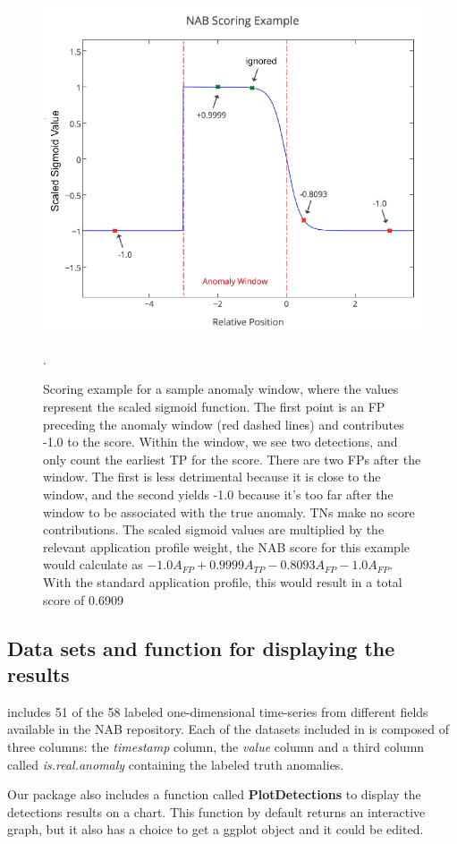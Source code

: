 \documentclass[a4paper]{article}
\begin{document}
\begin{figure}[htbp]
\centering
\includegraphics[width=0.7\linewidth]{ScoreExample.PNG}
\caption{Scoring example for a sample anomaly window, where the values represent the scaled sigmoid function. The first point is an FP preceding the anomaly window (red dashed lines) and contributes -1.0 to the score. Within the window, we see two detections, and only count the earliest TP for the score. There are two FPs after the window. The first is less detrimental because it is close to the window, and the second yields -1.0 because it's too far after the window to be associated with the true anomaly. TNs make no score contributions. The scaled sigmoid values are multiplied by the relevant application profile weight, the NAB score for this example would calculate as \( -1.0 A_{FP} + 0.9999 A_{TP} - 0.8093 A_{FP} - 1.0 A_{FP}\). With the standard application profile, this would result in a total score of 0.6909 \cite{7424283}}.
\label{fig:ScoringEx}
\end{figure}

\subsection{Data sets and function for displaying the results} \label{sec:display}

 includes 51 of the 58 labeled one-dimensional time-series from different fields available in the NAB \cite{7424283} repository. Each of the datasets included in  is composed of three columns: the \emph{timestamp} column, the \emph{value} column and a third column called \emph{is.real.anomaly} containing the labeled truth anomalies.

Our package also includes a function called \textbf{PlotDetections} to display the detections results on a chart. This function by default returns an interactive graph, but it also has a choice to get a ggplot object and it could be edited.
\end{document}
